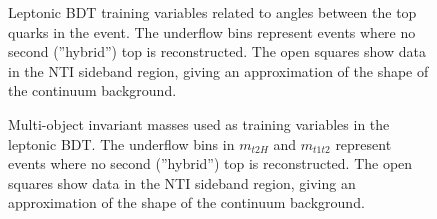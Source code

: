 \begin{figure}[htbp]
  \centering
  \caption{Leptonic BDT training variables related to angles between the top quarks in the event. The underflow bins represent events where no second (''hybrid'') top is reconstructed. The open squares show data in the NTI sideband region, giving an approximation of the shape of the continuum background. }
  \label{fig:lepvbls4}
\end{figure}

\begin{figure}[htbp]
  \centering
  \caption{Multi-object invariant masses used as training variables in the leptonic BDT. The underflow bins in $m_{t2H}$ and $m_{t1t2}$ represent events where no second (''hybrid'') top is reconstructed. The open squares show data in the NTI sideband region, giving an approximation of the shape of the continuum background. }
  \label{fig:lepvbls5}
\end{figure}

